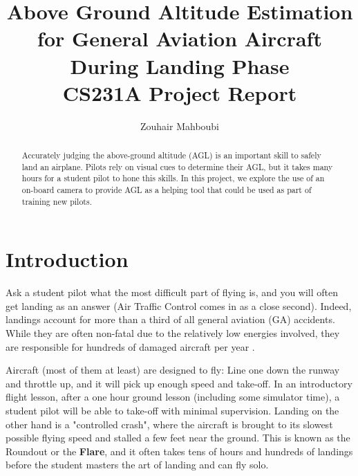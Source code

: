 \documentclass[letterpaper, conference]{IEEEtran}  %
\title{Above Ground Altitude Estimation for General Aviation Aircraft During Landing Phase\\
\vspace{1cm}
\small{CS231A Project Report}}
\author{Zouhair Mahboubi}
\begin{document}
 
\maketitle 


%






\begin{abstract}
Accurately judging the above-ground altitude (AGL) is an important skill to safely land an airplane. Pilots rely on visual cues to determine their AGL, but it takes many hours for a student pilot to hone this skills. In this project, we explore the use of an on-board camera to provide AGL as a helping tool that could be used as part of training new pilots.
\end{abstract}

\section{Introduction}
Ask a student pilot what the most difficult part of flying is, and you will often get landing as an answer (Air Traffic Control comes in as a close second). Indeed, landings account for more than a third of all general aviation (GA) accidents. While they are often non-fatal due to the relatively low energies involved, they are responsible for hundreds of damaged aircraft per year \cite{Aviat2012}.

Aircraft (most of them at least) are designed to fly: Line one down the runway and throttle up, and it will pick up enough speed and take-off. In an introductory flight lesson, after a one hour ground lesson (including some simulator time), a student pilot will be able to take-off with minimal supervision. Landing on the other hand is a "controlled crash", where the aircraft is brought to its slowest possible flying speed and stalled a few feet near the ground. This is known as the Roundout or the \textbf{Flare}, and it often takes tens of hours and hundreds of landings before the student masters the art of landing and can fly solo.
\end{document}
